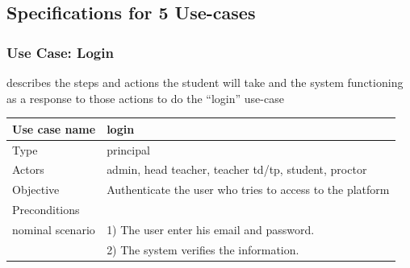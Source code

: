 \documentclass[]{uc2pfecaneva}
\begin{document}
    \thispagestyle{empty}
    \begin{table}
        \raggedright\subsection{Specifications for 5 Use-cases}

        \raggedright\subsubsection{Use Case: Login}
        describes the steps and actions the student will take and the system functioning as a response
        to those actions to do the “login” use-case\linebreak \\
        \begin{tabularx}{\textwidth}{|l|X|}
            \hline
            Use case name         & login                                                                                                                                                                \\ \hline
            Type                  & principal                                                                                                                                                            \\ \hline
            Actors                & admin, head teacher, teacher td/tp, student, proctor                                                                                                                 \\ \hline
            Objective             & Authenticate the user who tries to access to the platform                                                                                                            \\ \hline
            Preconditions         &                                                                                                                                                                      \\ \hline
            nominal scenario
            & 1) The user enter his email and password.                                                                                                                            \\
            & 2) The system verifies the information.                                                                                                                              \\

\end{tabularx}
\end{table}
\end{document}
